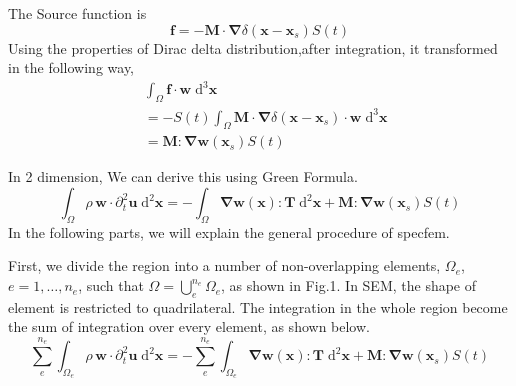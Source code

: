 \documentclass{article}
\begin{document}
The Source function is 
\begin{equation}
 \boldsymbol{f} = -\boldsymbol{M}\cdot\boldsymbol\nabla\delta(\boldsymbol x-\boldsymbol x_s)S(t)
\end{equation}
Using the properties of Dirac delta distribution,after integration, it transformed in the following way,
\begin{equation}
\begin{aligned}
 &\int_\Omega \boldsymbol f\cdot \boldsymbol w\;\mathrm{d}^3\boldsymbol x\\
 &= -S(t)\int_\Omega\boldsymbol{M}\cdot \boldsymbol\nabla\delta(\boldsymbol x-\boldsymbol x_s)\cdot \boldsymbol w\;\mathrm{d}^3\boldsymbol x\\
 &= \boldsymbol{M}:\boldsymbol{\nabla w}(\boldsymbol x_s)S (t)
\end{aligned}
\end{equation}

In 2 dimension, We can derive this using Green Formula. 
\begin{equation}
 \int_\Omega \rho\,\boldsymbol w\cdot \partial_t^2\boldsymbol u\;\mathrm{d}^2\boldsymbol x = -\int_\Omega \boldsymbol{\nabla}\boldsymbol w(\boldsymbol x): \boldsymbol T\;\mathrm{d}^2\boldsymbol x + \boldsymbol{M}:\boldsymbol{\nabla w}(\boldsymbol x_s)S (t)
\end{equation}
In the following parts, we will explain the general procedure of specfem.

First, we divide the region into  a number of non-overlapping elements, $\Omega_e$, $e=1, \ldots, n_e$, such that $\Omega=\bigcup_e^{n_e}\Omega_e$, as shown in Fig.1. In SEM, the shape of element is restricted to quadrilateral. The integration in the whole region become the sum of integration over every element, as shown below.
\begin{equation}
 \sum_e^{n_e}\int_{\Omega_e}  \rho\,\boldsymbol w\cdot \partial_t^2\boldsymbol u\;\mathrm{d}^2\boldsymbol x = -\sum_e^{n_e}\int_{\Omega_e} \boldsymbol{\nabla}\boldsymbol w(\boldsymbol x): \boldsymbol T\;\mathrm{d}^2\boldsymbol x + \boldsymbol{M}:\boldsymbol{\nabla w}(\boldsymbol x_s)S (t)
\end{equation}
\end{document}
